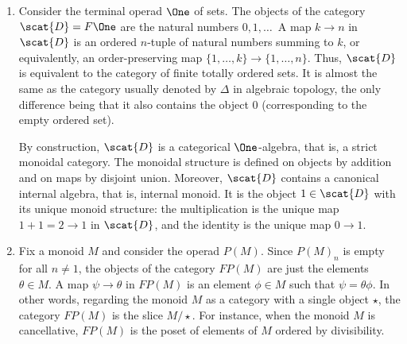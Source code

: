 \begin{examples}
\begin{enumerate}
\item 
{}
Consider the terminal%
% 
%
% 
operad $\One$ of sets.  The objects of the category
$\scat{D} = F\One$ are the natural numbers $0, 1, \ldots$\:\  A map $k \to n$
in $\scat{D}$ is an ordered $n$-tuple of natural numbers summing to $k$, or
equivalently, an order-preserving map $\{1, \ldots, k\} \to \{1, \ldots,
n\}$.  Thus, $\scat{D}$ is equivalent to the category of finite totally
ordered%
%
%
sets.  It is almost the same as the category usually denoted by $\Delta$ in
algebraic topology, the only difference being that it also contains the
object $0$ (corresponding to the empty ordered set).

By construction, $\scat{D}$ is a categorical $\One$-algebra, that is, a
strict monoidal category.  The monoidal structure is defined on objects by
addition and on maps by disjoint union.  Moreover, $\scat{D}$ contains a
canonical internal algebra, that is, internal monoid.  It is the object $1
\in \scat{D}$ with its unique monoid structure: the multiplication is the
unique map $1 + 1 = 2 \to 1$ in $\scat{D}$, and the identity is the unique
map $0 \to 1$.

\item
Fix a monoid%
%
%
% 
$M$ and consider the operad $P(M)$.  Since $P(M)_n$ is empty for all $n
\neq 1$, the objects of the category $FP(M)$ are just the elements $\theta
\in M$.  A map $\psi \to \theta$ in $FP(M)$ is an element $\phi \in M$ such
that $\psi = \theta\phi$.  In other words, regarding the monoid $M$ as a
category with a single object $\star$, the category $FP(M)$ is the slice 
$M/\star$.  For instance, when the monoid $M$ is cancellative, $FP(M)$ is
the poset of elements of $M$ ordered by divisibility.


\end{enumerate}
\end{examples}
